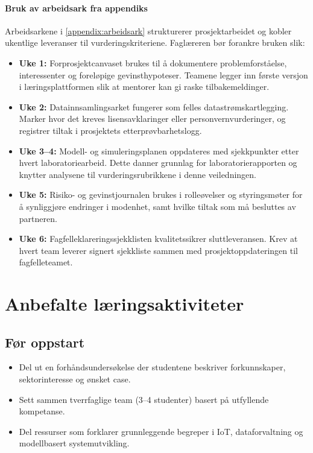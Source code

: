 \paragraph{Bruk av arbeidsark fra appendiks}
Arbeidsarkene i \autoref{appendix:arbeidsark} strukturerer prosjektarbeidet og kobler ukentlige
leveranser til vurderingskriteriene. Faglæreren bør forankre bruken slik:
\begin{itemize}
    \item \textbf{Uke 1:} Forprosjektcanvaset brukes til å dokumentere problemforståelse, interessenter og foreløpige
    gevinsthypoteser. Teamene legger inn første versjon i læringsplattformen slik at mentorer kan gi
    raske tilbakemeldinger.
    \item \textbf{Uke 2:} Datainnsamlingsarket fungerer som felles datastrømskartlegging. Marker hvor det kreves lisensavklaringer
    eller personvernvurderinger, og registrer tiltak i prosjektets etterprøvbarhetslogg.
    \item \textbf{Uke 3--4:} Modell- og simuleringsplanen oppdateres med sjekkpunkter etter hvert laboratoriearbeid. Dette
    danner grunnlag for laboratorierapporten og knytter analysene til vurderingsrubrikkene i denne veiledningen.
    \item \textbf{Uke 5:} Risiko- og gevinstjournalen brukes i rolleøvelser og styringsmøter for å synliggjøre
    endringer i modenhet, samt hvilke tiltak som må besluttes av partneren.
    \item \textbf{Uke 6:} Fagfelleklareringssjekklisten kvalitetssikrer sluttleveransen. Krev at hvert team leverer signert sjekkliste
    sammen med prosjektoppdateringen til fagfelleteamet.
\end{itemize}

\section{Anbefalte læringsaktiviteter}
\subsection{Før oppstart}
\begin{itemize}
    \item Del ut en forhåndsundersøkelse der studentene beskriver forkunnskaper, sektorinteresse og ønsket case.
    \item Sett sammen tverrfaglige team (3--4 studenter) basert på utfyllende kompetanse.
    \item Del ressurser som forklarer grunnleggende begreper i IoT, dataforvaltning og modellbasert systemutvikling.
\end{itemize}

